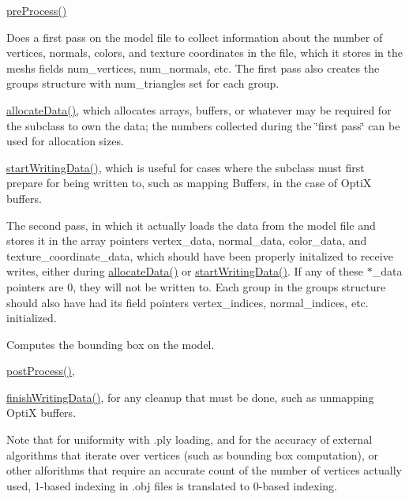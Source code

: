 \begin{DoxyItemize}
\item \hyperlink{class_mesh_base_a25e192211e37cb69f9b5ce9aea25989a}{pre\+Process()}
\item Does a first pass on the model file to collect information about the number of vertices, normals, colors, and texture coordinates in the file, which it stores in the mesh\textquotesingle{}s fields \textquotesingle{}num\+\_\+vertices\textquotesingle{}, \textquotesingle{}num\+\_\+normals\textquotesingle{}, etc. The first pass also creates the \textquotesingle{}groups\textquotesingle{} structure with \textquotesingle{}num\+\_\+triangles\textquotesingle{} set for each group\textquotesingle{}.
\item \hyperlink{class_mesh_base_a30c0ef8b3faabc9b41520b85dd9413bb}{allocate\+Data()}, which allocates arrays, buffers, or whatever may be required for the subclass to own the data; the numbers collected during the \char`\"{}first pass\char`\"{} can be used for allocation sizes.
\item \hyperlink{class_mesh_base_a67eb9bc7c4f6b074626078fe7779a8a4}{start\+Writing\+Data()}, which is useful for cases where the subclass must first prepare for being written to, such as mapping Buffers, in the case of OptiX buffers.
\item The second pass, in which it actually loads the data from the model file and stores it in the array pointers vertex\+\_\+data, normal\+\_\+data, color\+\_\+data, and texture\+\_\+coordinate\+\_\+data, which should have been properly initalized to receive writes, either during \hyperlink{class_mesh_base_a30c0ef8b3faabc9b41520b85dd9413bb}{allocate\+Data()} or \hyperlink{class_mesh_base_a67eb9bc7c4f6b074626078fe7779a8a4}{start\+Writing\+Data()}. If any of these $\ast$\+\_\+data pointers are \textquotesingle{}0\textquotesingle{}, they will not be written to. Each group in the groups structure should also have had its field pointers vertex\+\_\+indices, normal\+\_\+indices, etc. initialized.
\item Computes the bounding box on the model.
\item \hyperlink{class_mesh_base_a49ec1a25d18103982974f424b77fadc0}{post\+Process()},
\item \hyperlink{class_mesh_base_a000796d7b04985f137d5a1368e90bcc6}{finish\+Writing\+Data()}, for any cleanup that must be done, such as unmapping OptiX buffers.
\end{DoxyItemize}

Note that for uniformity with .ply loading, and for the accuracy of external algorithms that iterate over vertices (such as bounding box computation), or other alforithms that require an accurate count of the number of vertices actually used, 1-\/based indexing in .obj files is translated to 0-\/based indexing. \mbox{\label{class_mesh_base_a49ec1a25d18103982974f424b77fadc0}} 
